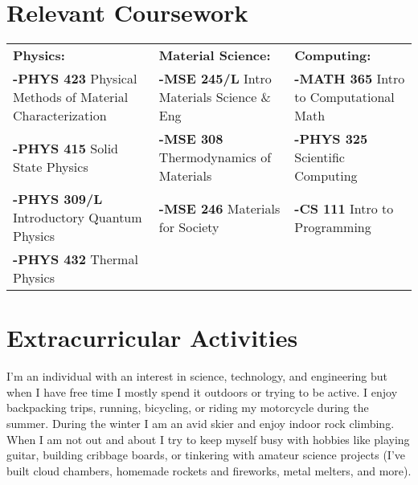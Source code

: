 \documentclass[a4paper,12pt]{article}
\begin{document}
 
\section{Relevant Coursework} 
\begin{tabularx}{\linewidth}{XXX}
        \textbf{Physics:} & \textbf{Material Science:} & \textbf{Computing:} \\
        \textbf{-PHYS 423} Physical Methods of Material Characterization & \textbf{-MSE 245/L} Intro Materials \newline Science \& Eng & \textbf{-MATH 365} Intro to \newline Computational Math \\ %
        \textbf{-PHYS 415} Solid State \newline Physics & \textbf{-MSE 308} Thermodynamics \newline of Materials & \textbf{-PHYS 325} Scientific \newline Computing \\
        \textbf{-PHYS 309/L} Introductory \newline Quantum Physics & \textbf{-MSE 246} Materials for \newline Society & \textbf{-CS 111} Intro to \newline Programming \\
        \textbf{-PHYS 432} Thermal Physics
\end{tabularx}


\section{Extracurricular Activities}
I’m an individual with an interest in science, technology, and engineering but when I have free time I mostly spend it outdoors or trying to be active. I enjoy backpacking trips, running, bicycling, or riding my motorcycle during the summer. During the winter I am an avid skier and enjoy indoor rock climbing. When I am not out and about I try to keep myself busy with hobbies like playing guitar, building cribbage boards, or tinkering with amateur science projects (I’ve built cloud chambers, homemade rockets and fireworks, metal melters, and more).
\end{document}
